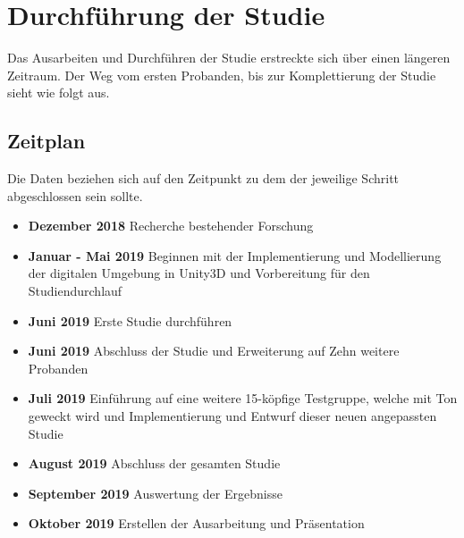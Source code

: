 \chapter{Durchführung der Studie}

Das Ausarbeiten und Durchführen der Studie erstreckte sich über einen längeren Zeitraum. Der Weg vom ersten Probanden, bis zur Komplettierung der Studie sieht wie folgt aus.
\section{Zeitplan}
Die Daten beziehen sich auf den Zeitpunkt zu dem der jeweilige Schritt abgeschlossen sein sollte.
\begin{itemize}
    \item \textbf{Dezember 2018} Recherche bestehender Forschung
    \item \textbf{Januar - Mai 2019} Beginnen mit der Implementierung und Modellierung der digitalen Umgebung in Unity3D und Vorbereitung für den Studiendurchlauf
    \item \textbf{Juni 2019} Erste Studie durchführen
    \item \textbf{Juni 2019} Abschluss der Studie und Erweiterung auf Zehn weitere Probanden
    \item \textbf{Juli 2019} Einführung auf eine weitere 15-köpfige Testgruppe, welche mit Ton geweckt wird und Implementierung und Entwurf dieser neuen angepassten Studie
    \item \textbf{August 2019} Abschluss der gesamten Studie
    \item \textbf{September 2019} Auswertung der Ergebnisse
    \item \textbf{Oktober 2019} Erstellen der Ausarbeitung und Präsentation
\end{itemize}

